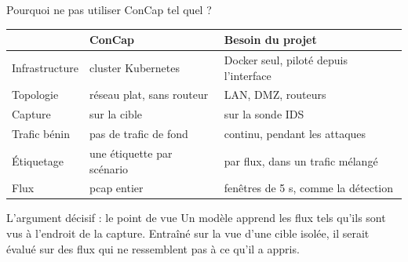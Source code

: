 \documentclass[aspectratio=169,11pt,xcolor=table]{beamer}
\begin{document}
\begin{frame}{Pourquoi ne pas utiliser ConCap tel quel ?}
  \small
  \renewcommand{\arraystretch}{1.2}
  \begin{tabularx}{\linewidth}{@{}p{.2\linewidth}XX@{}}
    \toprule
    & \textbf{ConCap} & \textbf{Besoin du projet} \\
    \midrule
    Infrastructure & cluster Kubernetes & Docker seul, piloté depuis l'interface \\
    Topologie & réseau plat, sans routeur & LAN, DMZ, routeurs \\
    Capture & sur la cible & sur la sonde IDS \\
    Trafic bénin & pas de trafic de fond & continu, pendant les attaques \\
    Étiquetage & une étiquette par scénario & par flux, dans un trafic mélangé \\
    Flux & pcap entier & fenêtres de 5 s, comme la détection \\
    \bottomrule
  \end{tabularx}
  \vfill
  \normalsize
  \begin{block}{L'argument décisif : le point de vue}
    Un modèle apprend les flux tels qu'ils sont vus à l'endroit de la capture. Entraîné sur la vue d'une cible isolée, il serait évalué sur des flux qui ne ressemblent pas à ce qu'il a appris.
  \end{block}
\end{frame}
\end{document}
